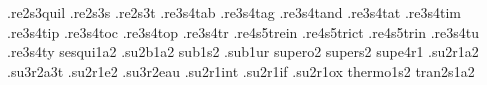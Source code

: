 {.re2s3quil                                                                      
.re2s3s                                                                         
.re2s3t                                                                         
.re3s4tab                                                                       
.re3s4tag                                                                       
.re3s4tand                                                                      
.re3s4tat                                                                       
.re3s4tim                                                                       
.re3s4tip                                                                       
.re3s4toc                                                                       
.re3s4top                                                                       
.re3s4tr                                                                        
.re4s5trein                                                                     
.re4s5trict                                                                     
.re4s5trin                                                                      
.re3s4tu                                                                        
.re3s4ty                                                                        
sesqui1a2                                                                       
.su2b1a2                                                                        
sub1s2                                                                          
.sub1ur                                                                         
supero2                                                                         
supers2                                                                         
supe4r1                                                                         
.su2r1a2                                                                        
.su3r2a3t                                                                       
.su2r1e2                                                                        
.su3r2eau                                                                       
.su2r1int                                                                       
.su2r1if                                                                        
.su2r1ox                                                                        
thermo1s2                                                                       
tran2s1a2                                                                       
}
